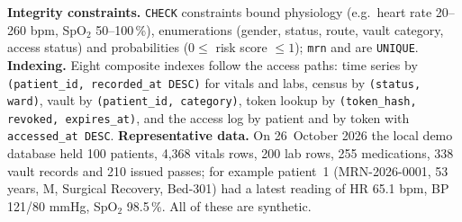 \textbf{Integrity constraints.} \texttt{CHECK} constraints bound physiology (e.g.\ heart rate 20--260 bpm,
SpO$_2$ 50--100\,\%), enumerations (gender, status, route, vault category, access status) and probabilities
($0 \le$ risk score $\le 1$); \texttt{mrn} and  are \texttt{UNIQUE}.
\textbf{Indexing.} Eight composite indexes follow the access paths: time series by
\texttt{(patient\_id, recorded\_at DESC)} for vitals and labs, census by \texttt{(status, ward)}, vault by
\texttt{(patient\_id, category)}, token lookup by \texttt{(token\_hash, revoked, expires\_at)}, and the
access log by patient and by token with \texttt{accessed\_at DESC}. \textbf{Representative data.} On
26~October 2026 the local demo database held 100 patients, 4{,}368 vitals rows, 200 lab rows, 255
medications, 338 vault records and 210 issued passes; for example patient~1 (MRN-2026-0001, 53 years, M,
Surgical Recovery, Bed-301) had a latest reading of HR 65.1 bpm, BP 121/80 mmHg, SpO$_2$ 98.5\,\%. All of
these are synthetic.

